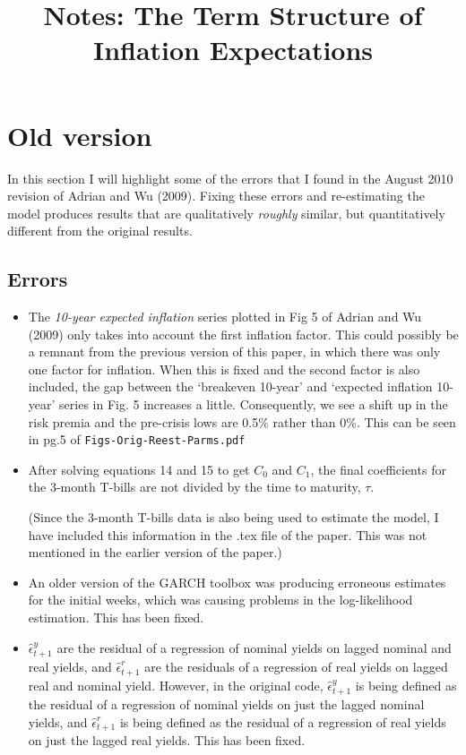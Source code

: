 \documentclass{report}
\begin{document}
\title{Notes: The Term Structure of Inflation Expectations}
\maketitle
 
\tableofcontents{}
 
\chapter{Old version}
In this section I will highlight some of the errors that I found in the August 2010 revision of Adrian and Wu (2009). Fixing these errors and re-estimating the model produces results that are qualitatively \textit{roughly} similar, but quantitatively different from the original results.\\

\section{Errors}

\begin{itemize}

\item The \textit{10-year expected inflation} series plotted in Fig 5 of Adrian and Wu (2009) only takes into account the first inflation factor. This could possibly be a remnant from the previous version of this paper, in which there was only one factor for inflation. When this is fixed and the second factor is also included, the gap between the `breakeven 10-year' and `expected inflation 10-year' series in Fig. 5 increases a little. Consequently, we see a shift up in the risk premia and the pre-crisis lows are 0.5\% rather than 0\%. This can be seen in pg.5 of \texttt{Figs-Orig-Reest-Parms.pdf}

\item After solving equations 14 and 15 to get $C_0$ and $C_1$, the final coefficients for the 3-month T-bills are not divided by the time to maturity, $\tau$.

(Since the 3-month T-bills data is also being used to estimate the model, I have included this information in the .tex file of the paper. This was not mentioned in the earlier version of the paper.)

\item An older version of the GARCH toolbox was producing erroneous estimates for the initial weeks, which was causing problems in the log-likelihood estimation. This has been fixed.

\item $\hat{\epsilon}^y_{t+1}$ are the residual of a regression of nominal yields on lagged nominal and real yields, and $\hat{\epsilon}^r_{t+1}$ are the residuals of a regression of real yields on lagged real and nominal yield. However, in the original code, $\hat{\epsilon}^y_{t+1}$ is being defined as the residual of a regression of nominal yields on just the lagged nominal yields, and $\hat{\epsilon}^r_{t+1}$ is being defined as the residual of a regression of real yields on just the lagged real yields. This has been fixed.


\end{itemize}
\end{document}
